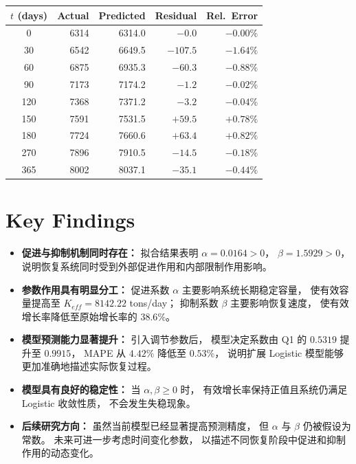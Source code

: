 \documentclass[12pt,a4paper]{article}
\begin{document}
\begin{center}
\begin{tabular}{crrrr}
\toprule
$t$ (days) & Actual & Predicted & Residual & Rel.\ Error \\
\midrule
0   & 6314 & 6314.0 & $-0.0$    & $-0.00\%$ \\
30  & 6542 & 6649.5 & $-107.5$  & $-1.64\%$ \\
60  & 6875 & 6935.3 & $-60.3$   & $-0.88\%$ \\
90  & 7173 & 7174.2 & $-1.2$    & $-0.02\%$ \\
120 & 7368 & 7371.2 & $-3.2$    & $-0.04\%$ \\
150 & 7591 & 7531.5 & $+59.5$   & $+0.78\%$ \\
180 & 7724 & 7660.6 & $+63.4$   & $+0.82\%$ \\
270 & 7896 & 7910.5 & $-14.5$   & $-0.18\%$ \\
365 & 8002 & 8037.1 & $-35.1$   & $-0.44\%$ \\
\bottomrule
\end{tabular}
\end{center}

\section{Key Findings}

\begin{itemize}

\item
\textbf{促进与抑制机制同时存在：}
拟合结果表明 $\alpha=0.0164>0$，
$\beta=1.5929>0$，
说明恢复系统同时受到外部促进作用和内部限制作用影响。

\item
\textbf{参数作用具有明显分工：}
促进系数 $\alpha$ 主要影响系统长期稳定容量，
使有效容量提高至 $K_{eff}=8142.22$ tons/day；
抑制系数 $\beta$ 主要影响恢复速度，
使有效增长率降低至原始增长率的 $38.6\%$。

\item
\textbf{模型预测能力显著提升：}
引入调节参数后，
模型决定系数由 Q1 的 $0.5319$ 提升至 $0.9915$，
MAPE 从 $4.42\%$ 降低至 $0.53\%$，
说明扩展 Logistic 模型能够更加准确地描述实际恢复过程。

\item
\textbf{模型具有良好的稳定性：}
当 $\alpha,\beta\ge0$ 时，
有效增长率保持正值且系统仍满足 Logistic 收敛性质，
不会发生失稳现象。

\item
\textbf{后续研究方向：}
虽然当前模型已经显著提高预测精度，
但 $\alpha$ 与 $\beta$ 仍被假设为常数。
未来可进一步考虑时间变化参数，
以描述不同恢复阶段中促进和抑制作用的动态变化。

\end{itemize}
\end{document}
